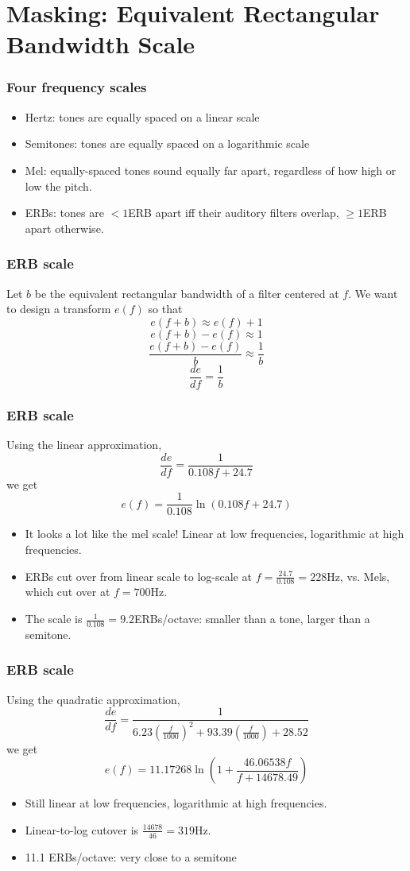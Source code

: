 \documentclass{beamer}
\begin{document}
\section[ERB]{Masking: Equivalent Rectangular Bandwidth Scale}
\setcounter{subsection}{1}

\begin{frame}
  \frametitle{Four frequency scales}

  \begin{itemize}
  \item Hertz: tones are equally spaced on a linear scale
  \item Semitones: tones are equally spaced on a logarithmic scale
  \item Mel: equally-spaced tones sound equally far apart, regardless of how high or
    low the pitch.
  \item ERBs: tones are $<1$ERB apart iff their auditory filters
    overlap, $\ge 1$ERB apart otherwise.
  \end{itemize}
\end{frame}

\begin{frame}
  \frametitle{ERB scale}

  Let $b$ be the equivalent rectangular bandwidth of a filter centered at $f$.
  We want to design a transform $e(f)$ so that
  \[
  e(f+b)\approx e(f)+1
  \]
  \[
  e(f+b)-e(f)  \approx 1
  \]
  \[
  \frac{e(f+b)-e(f)}{b} \approx \frac{1}{b}
  \]
  \[
  \frac{de}{df} = \frac{1}{b}
  \]
\end{frame}
\begin{frame}
  \frametitle{ERB scale}

  Using the linear approximation,
  \[
  \frac{de}{df} = \frac{1}{0.108 f + 24.7}
  \]
  we get
  \[
  e(f)  = \frac{1}{0.108}\ln\left(0.108f+24.7\right)
  \]
  \begin{itemize}
  \item It looks a lot like the mel scale!  Linear at low frequencies,
    logarithmic at high frequencies.
  \item ERBs cut over from linear scale to log-scale at $f=\frac{24.7}{0.108}=228$Hz,
    vs. Mels, which cut over at $f=700$Hz.
  \item The scale is $\frac{1}{0.108}=9.2$ERBs/octave: smaller than a tone, larger than
    a semitone.
  \end{itemize}
\end{frame}
\begin{frame}
  \frametitle{ERB scale}

  Using the quadratic approximation,
  \[
  \frac{de}{df} = \frac{1}{6.23\left(\frac{f}{1000}\right)^2 + 93.39\left(\frac{f}{1000}\right)+28.52}
  \]
  we get
  \[
  e(f)  = 11.17268 \ln\left(1+\frac{46.06538f}{f+14678.49}\right)
  \]
  \begin{itemize}
  \item Still linear at low frequencies,
    logarithmic at high frequencies.
  \item Linear-to-log cutover is $\frac{14678}{46}=319$Hz.
  \item 11.1 ERBs/octave: very close to a semitone
  \end{itemize}
\end{frame}
\end{document}
